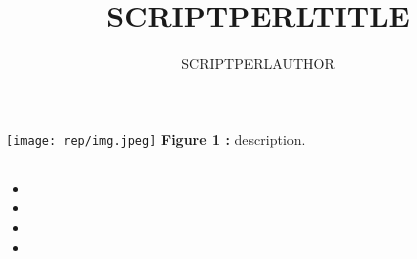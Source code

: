 \documentclass{report}
\title{SCRIPTPERLTITLE}
\author{SCRIPTPERLAUTHOR}
\date{}
\begin{document}
        \maketitle %




\chapter{}
        \section{}
                \paragraph*{}
                        \vspace{1cm}
                        \begin{center}
                                \texttt{[image: rep/img.jpeg]}
                                \textbf{Figure 1 :} description.
                        \end{center}
        \section{}
                \paragraph*{}
                        \begin{itemize} %
                                \item
                                \item
                                \item
                                \item
                        \end{itemize} 
\end{document}

